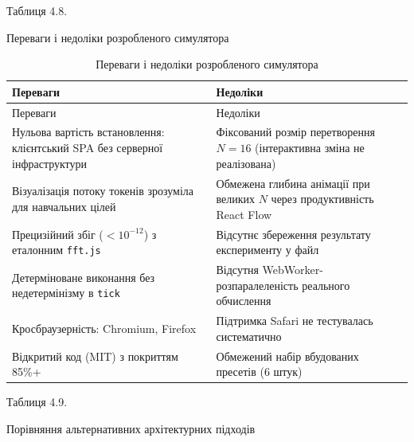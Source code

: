 Таблиця 4.8.

Переваги і недоліки розробленого симулятора

\begin{longtable}[]{@{}
  >{\raggedright\arraybackslash}p{}
  >{\raggedright\arraybackslash}p{}@{}}
\caption[Переваги і недоліки симулятора]{Переваги і недоліки
розробленого симулятора}\tabularnewline
\toprule\noalign{}
\begin{minipage}[b]{\linewidth}\raggedright
Переваги
\end{minipage} & \begin{minipage}[b]{\linewidth}\raggedright
Недоліки
\end{minipage} \\
\midrule\noalign{}
\endfirsthead
\toprule\noalign{}
\begin{minipage}[b]{\linewidth}\raggedright
Переваги
\end{minipage} & \begin{minipage}[b]{\linewidth}\raggedright
Недоліки
\end{minipage} \\
\midrule\noalign{}
\endhead
\bottomrule\noalign{}
\endlastfoot
Нульова вартість встановлення: клієнтський SPA без серверної
інфраструктури & Фіксований розмір перетворення \(N=16\) (інтерактивна
зміна не реалізована) \\
Візуалізація потоку токенів зрозуміла для навчальних цілей & Обмежена
глибина анімації при великих \(N\) через продуктивність React Flow \\
Прецизійний збіг (\(<10^{-12}\)) з еталонним \texttt{fft.js} &
Відсутнє збереження результату експерименту у файл \\
Детерміноване виконання без недетермінізму в \texttt{tick} & Відсутня
WebWorker-розпаралеленість реального обчислення \\
Кросбраузерність: Chromium, Firefox & Підтримка Safari не тестувалась
систематично \\
Відкритий код (MIT) з покриттям 85\%+ & Обмежений набір вбудованих
пресетів (6 штук) \\
\end{longtable}

Таблиця 4.9.

Порівняння альтернативних архітектурних підходів

